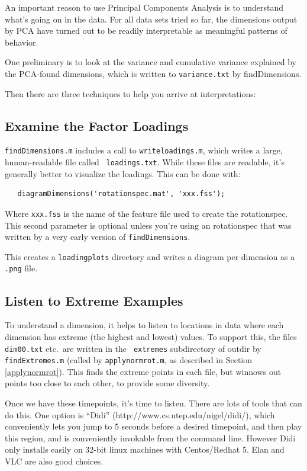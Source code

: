 \documentclass[11pt]{article}
\begin{document}
An important reason to use Principal Components Analysis is to
understand what's going on in the data.  For all data sets tried so
far, the dimensions output by PCA have turned out to be readily
interpretable as meaningful patterns of behavior.  

One preliminary is
to look at the variance and cumulative variance explained by the
PCA-found dimensions, which is written to {\tt variance.txt} by
findDimensions. 

Then there are three techniques to help you arrive at
interpretations:


\subsection{Examine the Factor Loadings}

{\tt findDimensions.m} includes a call to {\tt writeloadings.m}, which
writes a large, human-readable file called {\tt
  loadings.txt}.  While these files are readable, it's generally better
to visualize the loadings.  This can be done with:

\begin{verbatim}
   diagramDimensions('rotationspec.mat', 'xxx.fss');
\end{verbatim}

Where {\tt xxx.fss} is the name of the feature file used to create the
rotationspec.  This second parameter is optional unless you're using
an rotationspec that was written by a very early version of
{\tt findDimensions}.

This creates a {\tt loadingplots} directory and writes a diagram
per dimension as a {\tt .png} file.

\subsection{Listen to Extreme Examples}

To understand a dimension, it helps to listen to locations in data
where each dimension has extreme (the highest and lowest) values.  To
support this, the files {\tt dim00.txt} etc.\ are written in the {\tt
  extremes} subdirectory of outdir by {\tt findExtremes.m} (called by
{\tt applynormrot.m}, as described in Section \ref{applynormrot}).
This finds the extreme points in each file, but winnows out points too
close to each other, to provide some diversity.

Once we have these timepoints, it's time to listen.  There are lots of
tools that can do this.  One option is ``Didi''
(http://www.cs.utep.edu/nigel/didi/), which conveniently lets you jump
to 5 seconds before a desired timepoint, and then play this region,
and is conveniently invokable from the command line.  However Didi
only installs easily on 32-bit linux machines with Centos/Redhat 5.
Elan and VLC are also good choices.
\end{document}
